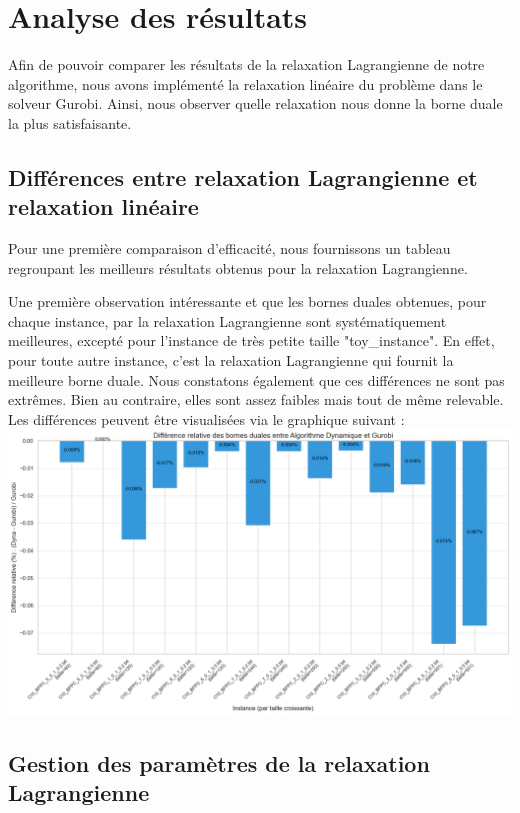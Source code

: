 \documentclass[french,nochapter,11pt]{rapportUB}
\begin{document}
	\section{Analyse des résultats}
	
	Afin de pouvoir comparer les résultats de la relaxation Lagrangienne de notre algorithme, nous avons implémenté la relaxation linéaire du problème dans le solveur Gurobi. Ainsi, nous observer quelle relaxation nous donne la borne duale la plus satisfaisante. 
	
	\subsection{Différences entre relaxation Lagrangienne et relaxation linéaire}
	
	Pour une première comparaison d'efficacité, nous fournissons un tableau regroupant les meilleurs résultats obtenus pour la relaxation Lagrangienne. 
	
	
	
	Une première observation intéressante et que les bornes duales obtenues, pour chaque instance, par la relaxation Lagrangienne sont systématiquement meilleures, excepté pour l'instance de très petite taille "toy\_instance". En effet, pour toute autre instance, c'est la relaxation Lagrangienne qui fournit la meilleure borne duale. Nous constatons également que ces différences ne sont pas extrêmes. Bien au contraire, elles sont assez faibles mais tout de même relevable.  Les différences peuvent être visualisées via le graphique suivant : \\
	
\includegraphics[width=1\textwidth]{diffDynaGuro.png}


	
	\subsection{Gestion des paramètres de la relaxation Lagrangienne}
	
\end{document}
